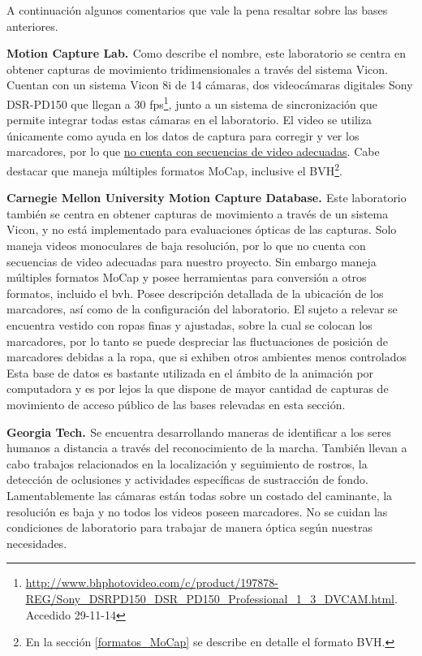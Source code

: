 A continuación algunos comentarios que vale la pena resaltar sobre  las bases anteriores.

\textbf{Motion Capture Lab. \cite{MCL}} %
		Como describe el nombre, este laboratorio se centra en obtener capturas de movimiento tridimensionales a través del sistema Vicon. Cuentan con un sistema Vicon 8i de 14 cámaras, dos videocámaras digitales Sony DSR-PD150 que llegan a 30 fps\footnote{\textcolor{blue}{{\scriptsize\underline{\url{http://www.bhphotovideo.com/c/product/197878-REG/Sony_DSRPD150_DSR_PD150_Professional_1_3_DVCAM.html}}}}. Accedido 29-11-14 }, junto a un sistema de sincronización que permite integrar todas estas cámaras en el laboratorio. El video se utiliza únicamente como ayuda en los datos de captura para corregir y ver los marcadores,  por lo que \underline{no cuenta con secuencias de video adecuadas}. Cabe destacar que maneja múltiples formatos MoCap, inclusive el BVH\footnote{En la sección \ref{formatos_MoCap} se describe en detalle el formato BVH.}.

\textbf{Carnegie Mellon University Motion Capture Database. \cite{CMU}}
 Este laboratorio también se centra en obtener capturas de movimiento a través de un sistema Vicon, y no está implementado para evaluaciones ópticas de las capturas. Solo maneja videos monoculares de baja resolución, por lo que no cuenta con secuencias de video adecuadas para nuestro proyecto. Sin embargo maneja múltiples formatos MoCap y  posee herramientas para conversión a otros formatos, incluido el bvh. Posee descripción detallada de la ubicación de los marcadores, así como de la configuración del laboratorio. El sujeto a relevar se encuentra vestido con ropas finas y ajustadas, sobre la cual se colocan los marcadores, por lo tanto se puede despreciar las fluctuaciones de posición de marcadores debidas a la ropa, que si exhiben otros ambientes menos controlados  Esta base de datos es bastante utilizada en el ámbito de la  animación por computadora y es por lejos la que dispone de mayor cantidad de capturas de movimiento de acceso público de las bases relevadas en esta sección.

\textbf{Georgia Tech. \cite{GT} }
Se encuentra desarrollando maneras de identificar a los seres humanos a distancia a través del reconocimiento de la marcha. También llevan a cabo trabajos relacionados en la localización y seguimiento de rostros, la detección de oclusiones y actividades específicas de sustracción de fondo.
Lamentablemente las cámaras están todas sobre un costado del caminante, la resolución es baja y no todos los videos poseen marcadores. No se cuidan las condiciones de laboratorio para trabajar de manera óptica según nuestras necesidades.


